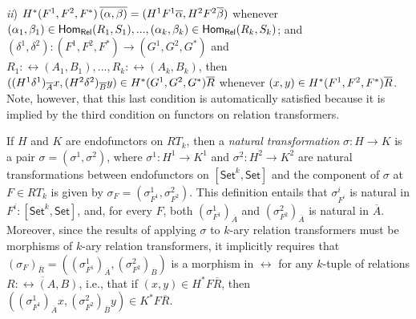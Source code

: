 \documentclass[runningheads]{llncs}
\newcommand{\set}{\mathsf{Set}}
\begin{document}
{\em ii})
  $H^*(F^1,F^2,F^*)\, \overline{(\alpha, \beta)} = (H^1F^1\overline{\alpha}, H^2F^2
  \overline{\beta})$ whenever $(\alpha_1, \beta_1) \in \mathsf{Hom_{Rel}}(R_1,S_1),..., (\alpha_k,
  \beta_k) \in \mathsf{Hom_{Rel}}(R_k,S_k)$; and
  $(\delta^1,\delta^2) : (F^1,F^2,F^*)\to (G^1,G^2,G^*)$ and
  $R_1:\rel(A_1,B_1),...,R_k:\rel(A_k,B_k)$, then
  $((H^1\delta^1)_{\overline{A}}x, (H^2\delta^2)_{\overline{B}}y) \in
  H^*(G^1,G^2,G^*)\overline{R}$ whenever $(x, y) \in
  H^*(F^1,F^2,F^*)\overline{R}$. Note, however, that this last condition is
  automatically satisfied because it is implied by the third condition
  on functors on relation transformers.

If $H$ and $K$ are endofunctors on $RT_k$, then a {\em natural
  transformation} $\sigma : H \to K$ is a pair $\sigma = (\sigma^1,
\sigma^2)$, where $\sigma^1 : H^1 \to K^1$ and $\sigma^2 : H^2 \to
K^2$ are natural transformations between endofunctors on
$[\set^k,\set]$ and the component of $\sigma$ at $F
\in RT_k$ is given by $\sigma_F = (\sigma^1_{F^1}, \sigma^2_{F^2})$.
This definition
entails that $\sigma^i_{F^i}$ is natural in $F^i : [\set^k,\set]$,
and, for every $F$, both $(\sigma^1_{F^1})_{\overline{A}}$ and
$(\sigma^2_{F^2})_{\overline{A}}$ is natural in $\overline{A}$.
Moreover, since the results of applying $\sigma$ to $k$-ary relation
transformers must be morphisms of $k$-ary relation transformers,
it implicitly requires that $(\sigma_F)_{\overline{R}} = (
(\sigma^1_{F^1})_{\overline{A}}, (\sigma^2_{F^2})_{\overline{B}})$ is
a morphism in $\rel$ for any $k$-tuple of relations $\overline{R :
  \rel(A, B)}$, i.e., that if $(x, y) \in H^*F\overline{R}$, then
$((\sigma^1_{F^1})_{\overline{A}} x, (\sigma^2_{F^2})_{\overline{B}}
y) \in K^*F\overline{R}$.
\end{document}
